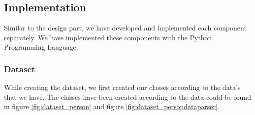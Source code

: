 \documentclass{mefsdp}
\begin{document}
	
%	
%	
	\subsection{Implementation}
	Similar to the design part, we have developed and implemented each component separately. We have implemented these components with the Python Programming Language.
	\subsubsection{Dataset}
	While creating the dataset, we first created our classes according to the data's that we have. The classes have been created according to the data could be found in figure \ref{fig:dataset_person} and figure \ref{fig:dataset_persondataparser}.\\
	
\end{document}
